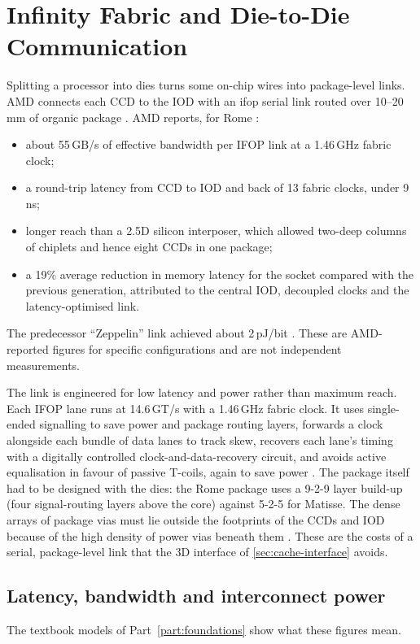 \section{Infinity Fabric and Die-to-Die Communication}
\label{sec:d2d}

Splitting a processor into dies turns some on-chip wires into package-level links. AMD connects each CCD to the IOD with an \gls{ifop} serial link routed over 10--20\,mm of organic package \cite{naffziger2020chiplet}. AMD reports, for Rome \cite{naffziger2020chiplet}:
\begin{itemize}
  \item about 55\,GB/s of effective bandwidth per IFOP link at a 1.46\,GHz fabric clock;
  \item a round-trip latency from CCD to IOD and back of 13 fabric clocks, under 9\,ns;
  \item longer reach than a 2.5D silicon interposer, which allowed two-deep columns of chiplets and hence eight CCDs in one package;
  \item a 19\% average reduction in memory latency for the socket compared with the previous generation, attributed to the central IOD, decoupled clocks and the latency-optimised link.
\end{itemize}
The predecessor ``Zeppelin'' link achieved about 2\,pJ/bit \cite{naffziger2020chiplet}. These are AMD-reported figures for specific configurations and are not independent measurements.

The link is engineered for low latency and power rather than maximum reach. Each IFOP lane runs at 14.6\,GT/s with a 1.46\,GHz fabric clock. It uses single-ended signalling to save power and package routing layers, forwards a clock alongside each bundle of data lanes to track skew, recovers each lane's timing with a digitally controlled clock-and-data-recovery circuit, and avoids active equalisation in favour of passive T-coils, again to save power \cite{naffziger2020chiplet}. The package itself had to be designed with the dies: the Rome package uses a 9-2-9 layer build-up (four signal-routing layers above the core) against 5-2-5 for Matisse. The dense arrays of package vias must lie outside the footprints of the CCDs and IOD because of the high density of power vias beneath them \cite{naffziger2020chiplet}. These are the costs of a serial, package-level link that the 3D interface of \cref{sec:cache-interface} avoids.

\subsection{Latency, bandwidth and interconnect power}
The textbook models of Part~\ref{part:foundations} show what these figures mean.


